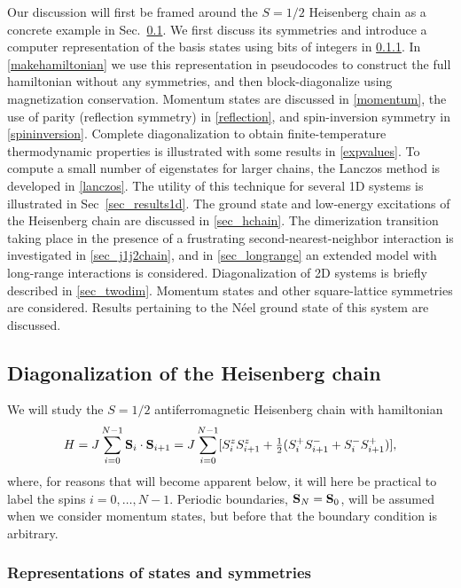 \documentclass[draft,numberedheadings]{aipproc}
\begin{document}
Our discussion will first be framed around the $S=1/2$ Heisenberg chain as a concrete example in Sec.~\ref{hbchaindiag}. We first discuss its symmetries
and introduce a computer representation of the basis states using bits of integers in \ref{staterepresentation}. In \ref{makehamiltonian} we use this representation 
in pseudocodes to construct the full hamiltonian without any symmetries, and then block-diagonalize using magnetization conservation. Momentum states 
are discussed in \ref{momentum}, the use of parity (reflection symmetry) in \ref{reflection}, and spin-inversion symmetry in \ref{spininversion}. Complete 
diagonalization to obtain finite-temperature thermodynamic properties is illustrated with some results in \ref{expvalues}. To compute a small number of 
eigenstates for larger chains, the Lanczos method is developed in \ref{lanczos}. The utility of this technique for several 1D systems is illustrated in
Sec~\ref{sec_results1d}. The ground state and low-energy excitations of the Heisenberg chain are discussed in \ref{sec_hchain}. The dimerization transition taking 
place in the presence of a frustrating second-nearest-neighbor interaction is investigated in \ref{sec_j1j2chain}, and in \ref{sec_longrange} an extended 
model with long-range interactions is considered. Diagonalization of 2D systems is briefly described in \ref{sec_twodim}. Momentum states and other square-lattice 
symmetries are considered. Results pertaining to the N\'eel ground state of this system are discussed.

\subsection{Diagonalization of the Heisenberg chain}
\label{hbchaindiag}

We will study the $S=1/2$ antiferromagnetic Heisenberg chain with hamiltonian
\begin{equation}
H = J\sum_{i=0}^{N-1} {\bf S}_i\cdot {\bf S}_{i+1} =
J\sum_{i=0}^{N-1} [S^z_iS^z_{i+1}+\hbox{$\frac{1}{2}$}(S^+_iS^-_{i+1}+S^-_iS^+_{i+1})],
\label{heis0}
\end{equation}
where, for reasons that will become apparent below, it will here be practical to label the spins $i = 0,\ldots,N-1$. Periodic boundaries, 
${\bf S}_{N}={\bf S}_0$, will be assumed when we consider momentum states, but before that the boundary condition is arbitrary.

\subsubsection{Representations of states and symmetries}
\label{staterepresentation}
\end{document}
